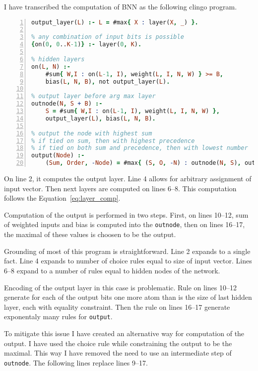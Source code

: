 \documentclass{fithesis}
\begin{document}
I have transcribed the computation of BNN as the following clingo program.

\begin{lstlisting}[language=prolog, numbers=left, countblanklines=false]
% output layer
output_layer(L) :- L = #max{ X : layer(X, _) }.

% any combination of input bits is possible
{on(0, 0..K-1)} :- layer(0, K).

% hidden layers
on(L, N) :-
    #sum{ W,I : on(L-1, I), weight(L, I, N, W) } >= B,
    bias(L, N, B), not output_layer(L).

% output layer before arg max layer
outnode(N, S + B) :-
    S = #sum{ W,I : on(L-1, I), weight(L, I, N, W) },
    output_layer(L), bias(L, N, B).

% output the node with highest sum
% if tied on sum, then with highest precedence
% if tied on both sum and precedence, then with lowest number
output(Node) :-
    (Sum, Order, -Node) = #max{ (S, O, -N) : outnode(N, S), outpre(N, O) }.
\end{lstlisting}

On line 2, it computes the output layer. Line 4 allows for arbitrary assignment
of input vector. Then next layers are computed on lines 6--8. This computation
follows the Equation~\ref{eq:layer_comp}.

Computation of the output is performed in two steps. First, on lines 10--12,
sum of weighted inputs and bias is computed into the \texttt{outnode}, then
on lines 16--17, the maximal of these values is choosen to be the output.

Grounding of most of this program is straightforward. Line 2 expands to
a single fact. Line 4 expands to number of choice rules equal to size of input
vector. Lines 6--8 expand to a number of rules equal to hidden nodes of the
network.

Encoding of the output layer in this case is problematic. Rule
on lines 10--12 generate for each of the output bits one more atom than is
the size of last hidden layer, each with equality constraint. Then the rule
on lines 16--17 generate %
exponentaly many rules for \texttt{output}.

To mitigate this issue I have created an alternative way for computation of
the output. I have used the choice rule while constraining the output to
be the maximal. This way I have removed the need to use an intermediate step
of \texttt{outnode}. The following lines replace lines 9--17.
\end{document}
